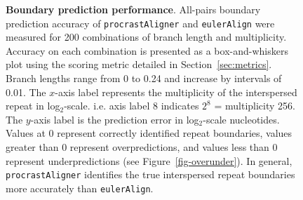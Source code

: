 \documentclass{llncs}
\begin{document}
\begin{figure}[t!]
\centering
{}
\caption{\textbf{Boundary prediction performance}. \scriptsize All-pairs boundary prediction accuracy of \texttt{procrastAligner} and \texttt{eulerAlign} were measured for 200 combinations of branch length and multiplicity.  Accuracy on each combination is presented as a box-and-whiskers plot using the scoring metric detailed in Section~\ref{sec:metrics}.  Branch lengths range from 0 to 0.24 and increase by intervals of 0.01.  The $x$-axis label represents the multiplicity of the interspersed repeat in log$_2$-scale. i.e. axis label 8 indicates $2^{8}$ = multiplicity 256. The $y$-axis label is the prediction error in log$_2$-scale nucleotides. Values at 0 represent correctly identified repeat boundaries, values greater than 0 represent overpredictions, and values less than 0 represent underpredictions (see Figure~\ref{fig-overunder}). In general, \texttt{procrastAligner} identifies the true interspersed repeat boundaries more accurately than \texttt{eulerAlign}.}
\label{fig-boundary}
\end{figure}
\end{document}
